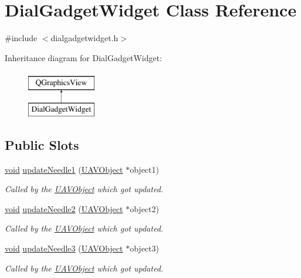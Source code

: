 \hypertarget{class_dial_gadget_widget}{\section{Dial\-Gadget\-Widget Class Reference}
\label{class_dial_gadget_widget}
}


{\ttfamily \#include $<$dialgadgetwidget.\-h$>$}

Inheritance diagram for Dial\-Gadget\-Widget\-:\begin{figure}[H]
\begin{center}
\leavevmode
\includegraphics[height=2.000000cm]{class_dial_gadget_widget}
\end{center}
\end{figure}
\subsection*{Public Slots}
\begin{DoxyCompactItemize}
\item 
\hyperlink{group___u_a_v_objects_plugin_ga444cf2ff3f0ecbe028adce838d373f5c}{void} \hyperlink{group___dial_plugin_ga20f0bcc550ca92ec3bd40b4cf0b2a38e}{update\-Needle1} (\hyperlink{class_u_a_v_object}{U\-A\-V\-Object} $\ast$object1)
\begin{DoxyCompactList}\small\item\em Called by the \hyperlink{class_u_a_v_object}{U\-A\-V\-Object} which got updated. \end{DoxyCompactList}\item 
\hyperlink{group___u_a_v_objects_plugin_ga444cf2ff3f0ecbe028adce838d373f5c}{void} \hyperlink{group___dial_plugin_gaf88f5db2a7b289050e6dc6a8cda27e0f}{update\-Needle2} (\hyperlink{class_u_a_v_object}{U\-A\-V\-Object} $\ast$object2)
\begin{DoxyCompactList}\small\item\em Called by the \hyperlink{class_u_a_v_object}{U\-A\-V\-Object} which got updated. \end{DoxyCompactList}\item 
\hyperlink{group___u_a_v_objects_plugin_ga444cf2ff3f0ecbe028adce838d373f5c}{void} \hyperlink{group___dial_plugin_gad0f863a46778ffadd8bf6dbdc01c4c81}{update\-Needle3} (\hyperlink{class_u_a_v_object}{U\-A\-V\-Object} $\ast$object3)
\begin{DoxyCompactList}\small\item\em Called by the \hyperlink{class_u_a_v_object}{U\-A\-V\-Object} which got updated. \end{DoxyCompactList}\end{DoxyCompactItemize}
